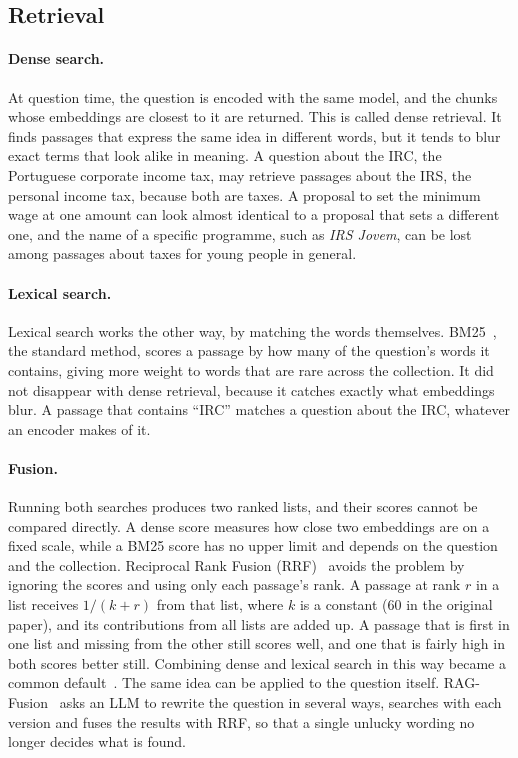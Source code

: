\subsection{Retrieval} \label{subsec:sota-retrieval}

\paragraph{Dense search.} At question time, the question is encoded with the same model, and the chunks whose embeddings are closest to it are returned. This is called dense retrieval. It finds passages that express the same idea in different words, but it tends to blur exact terms that look alike in meaning. A question about the IRC, the Portuguese corporate income tax, may retrieve passages about the IRS, the personal income tax, because both are taxes. A proposal to set the minimum wage at one amount can look almost identical to a proposal that sets a different one, and the name of a specific programme, such as \textit{IRS Jovem}, can be lost among passages about taxes for young people in general.

\paragraph{Lexical search.} Lexical search works the other way, by matching the words themselves. BM25~\citep{robertson2009bm25}, the standard method, scores a passage by how many of the question's words it contains, giving more weight to words that are rare across the collection. It did not disappear with dense retrieval, because it catches exactly what embeddings blur. A passage that contains ``IRC'' matches a question about the IRC, whatever an encoder makes of it.

\paragraph{Fusion.} Running both searches produces two ranked lists, and their scores cannot be compared directly. A dense score measures how close two embeddings are on a fixed scale, while a BM25 score has no upper limit and depends on the question and the collection. Reciprocal Rank Fusion (RRF)~\citep{cormack2009rrf} avoids the problem by ignoring the scores and using only each passage's rank. A passage at rank $r$ in a list receives $1/(k + r)$ from that list, where $k$ is a constant (60 in the original paper), and its contributions from all lists are added up. A passage that is first in one list and missing from the other still scores well, and one that is fairly high in both scores better still. Combining dense and lexical search in this way became a common default~\citep{rag-survey}. The same idea can be applied to the question itself. RAG-Fusion~\citep{rackauckas2024ragfusion} asks an LLM to rewrite the question in several ways, searches with each version and fuses the results with RRF, so that a single unlucky wording no longer decides what is found.

